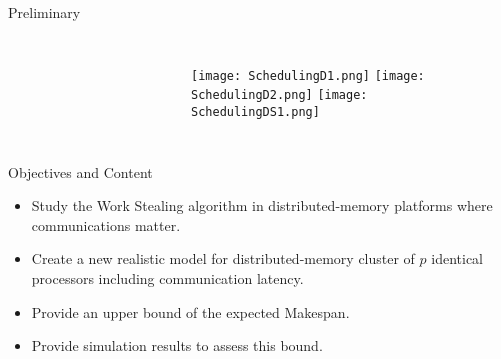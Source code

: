 \documentclass{beamer}
\begin{document}
\begin{frame}{Preliminary}
    \begin{figure}
    \begin{center}
    \end{center}
    \end{figure}

    \pause
    \begin{columns} 
      \begin{center}
        \end{center}
    \begin{figure}
    \begin{center}
    \end{center}
    \end{figure}

        \begin{center}
        \end{center}
    \begin{figure}
    \begin{center}
         {\texttt{[image: SchedulingD1.png]}}
         {\texttt{[image: SchedulingD2.png]}}
         {\texttt{[image: SchedulingDS1.png]}}
    \end{center}
    \end{figure}
    \end{columns} 


\end{frame}


\begin{frame}{Objectives and Content}
    \begin{itemize}%
        \item {
               Study the Work Stealing algorithm in distributed-memory platforms where communications matter. 
            }
        \item {

               Create a new realistic model for distributed-memory cluster of $p$ identical processors including communication latency. 
            }
        \item {
                Provide an upper bound of the expected Makespan.
            }
        \item {
               Provide simulation results to assess this bound. 
            }
    \end{itemize}
\end{frame}
\end{document}
